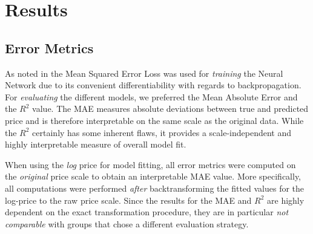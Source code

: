 \section{Results} \label{results}



\subsection{Error Metrics}

As noted in  the Mean Squared Error Loss was used for \emph{training} the Neural Network due to its convenient differentiability with regards to backpropagation.
For \emph{evaluating} the different models, we preferred the Mean Absolute Error and the $R^2$ value.
The MAE measures absolute deviations between true and predicted price and is therefore interpretable on the same scale as the original data.
While the $R^2$ certainly has some inherent flaws, it provides a scale-independent and highly interpretable measure of overall model fit.

When using the \emph{log} price for model fitting, all error metrics were computed on the \emph{original} price scale to obtain an interpretable MAE value.
More specifically, all computations were performed \emph{after} backtransforming the fitted values for the log-price to the raw price scale.
Since the results for the MAE and $R^2$ are highly dependent on the exact transformation procedure, they are in particular \emph{not comparable} with groups that chose a different evaluation strategy.

